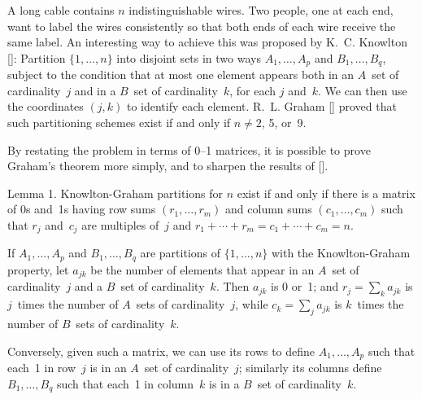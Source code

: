 \documentclass[a4paper,12pt]{article}
\begin{document}
{\baselineskip14pt

\meno
A  long cable contains $n$ indistinguishable wires. Two people, one at each
end, want to label the wires consistently so that both ends of each wire
receive the same label. An interesting way to achieve this was proposed by
K.~C. Knowlton
[\GK]:
Partition $\{1,\ldots,n\}$ into disjoint sets in two ways $A_1,\ldots,A_p$ and
$B_1,\ldots,B_q$, subject to the condition that at most one element appears
both in an $A$~set of cardinality~$j$ and in a $B$~set of cardinality~$k$, for
each $j$ and~$k$. We can then use the coordinates $(j,k)$ to identify each
element. R.~L. Graham
[\GR]
proved that such partitioning schemes exist if and only if $n\neq 2$, 5, or~9.

By restating the problem in terms of 0--1 matrices, it is possible to prove
Graham's theorem more simply, and to sharpen the results of
[\GR].

\proclaim
Lemma 1. Knowlton-Graham partitions for $n$ exist if and only if there is a
matrix of 0s and~1s having row sums $(r_1,\ldots,r_m)$ and column sums
$(c_1,\ldots,c_m)$ such that $r_j$ and~$c_j$ are multiples of~$j$ and
$r_1+\cdots +r_m=c_1+\cdots +c_m=n$.

\proof
If $A_1,\ldots,A_p$ and $B_1,\ldots,B_q$ are partitions of $\{1,\ldots,n\}$
with the Knowlton-Graham property, let $a_{jk}$ be the number of elements that
appear in an $A$~set of cardinality~$j$ and a $B$~set of cardinality~$k$. Then
$a_{jk}$ is 0 or~1; and $r_j=\sum_ka_{jk}$ is $j$~times the number of $A$~sets
of cardinality~$j$, while $c_k=\sum_ja_{jk}$ is $k$~times the number of
$B$~sets of cardinality~$k$.

Conversely, given such a matrix, we can use its rows
to define $A_1,\ldots,A_p$ such that each~1 in row~$j$ is in an $A$~set
of cardinality~$j$; similarly its columns define $B_1,\ldots,B_q$
such that each~1 in column~$k$ is in a $B$~set of cardinality~$k$. \ \pfbox

}
\end{document}
